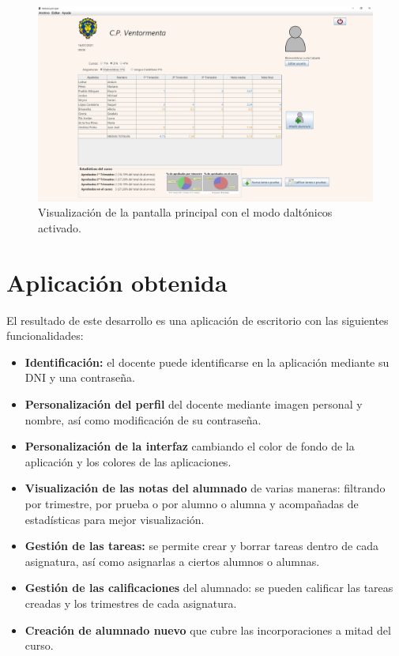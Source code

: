 \begin{figure}[H]
\centering\includegraphics[width=1\linewidth]{figs/appdaltonicos.png}
\caption{Visualización de la pantalla principal con el modo daltónicos activado.}
\label{Fig:appdaltonicos}
\end{figure}

\section{Aplicación obtenida}
El resultado de este desarrollo es una aplicación de escritorio con las siguientes funcionalidades:
\begin{itemize}
	\item \textbf{Identificación:} el docente puede identificarse en la aplicación mediante su DNI y una contraseña.
	\item \textbf{Personalización del perfil} del docente mediante imagen personal y nombre, así como modificación de su contraseña.
	\item \textbf{Personalización de la interfaz} cambiando el color de fondo de la aplicación y los colores de las aplicaciones.
	\item \textbf{Visualización de las notas del alumnado} de varias maneras: filtrando por trimestre, por prueba o por alumno o alumna y acompañadas de estadísticas para mejor visualización.
	\item \textbf{Gestión de las tareas:} se permite crear y borrar tareas dentro de cada asignatura, así como asignarlas a ciertos alumnos o alumnas.
	\item \textbf{Gestión de las calificaciones} del alumnado: se pueden calificar las tareas creadas y los trimestres de cada asignatura.
	\item \textbf{Creación de alumnado nuevo} que cubre las incorporaciones a mitad del curso.
\end{itemize}

